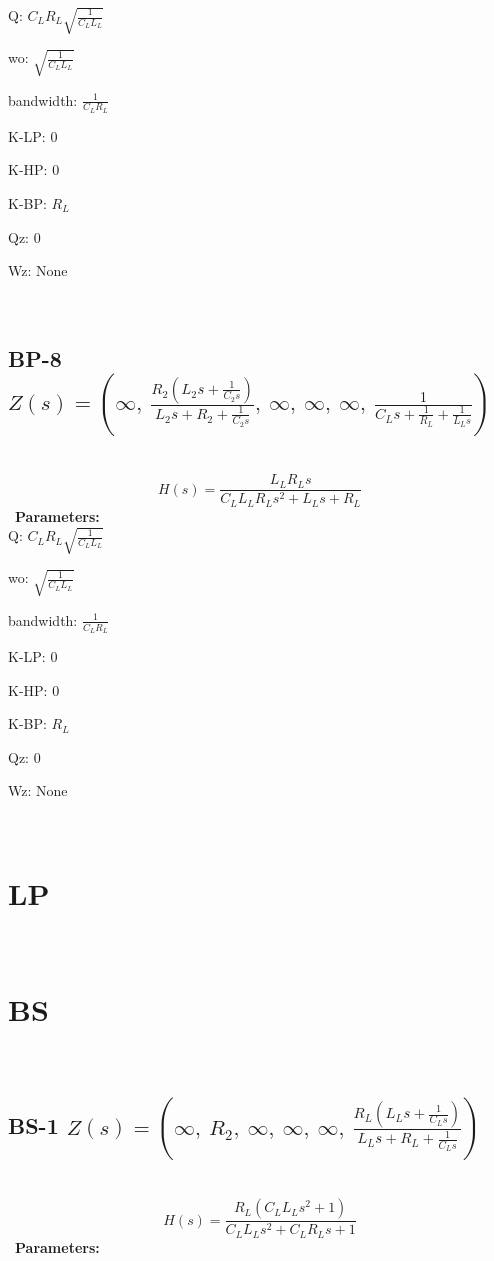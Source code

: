 \documentclass{article}
\begin{document}
Q: $C_{L} R_{L} \sqrt{\frac{1}{C_{L} L_{L}}}$\ 

wo: $\sqrt{\frac{1}{C_{L} L_{L}}}$\ 

bandwidth: $\frac{1}{C_{L} R_{L}}$\ 

K-LP: $0$\ 

K-HP: $0$\ 

K-BP: $R_{L}$\ 

Qz: $0$\ 

Wz: $\text{None}$\ 

\ 

\subsection{BP-8 $Z(s) = \left( \infty, \  \frac{R_{2} \left(L_{2} s + \frac{1}{C_{2} s}\right)}{L_{2} s + R_{2} + \frac{1}{C_{2} s}}, \  \infty, \  \infty, \  \infty, \  \frac{1}{C_{L} s + \frac{1}{R_{L}} + \frac{1}{L_{L} s}}\right)$ } \ 
\textbf{\[H(s) = \frac{L_{L} R_{L} s}{C_{L} L_{L} R_{L} s^{2} + L_{L} s + R_{L}}\] } \ 
\textbf{Parameters:}\\ 

Q: $C_{L} R_{L} \sqrt{\frac{1}{C_{L} L_{L}}}$\ 

wo: $\sqrt{\frac{1}{C_{L} L_{L}}}$\ 

bandwidth: $\frac{1}{C_{L} R_{L}}$\ 

K-LP: $0$\ 

K-HP: $0$\ 

K-BP: $R_{L}$\ 

Qz: $0$\ 

Wz: $\text{None}$\ 

\ 

\section{LP}\ 
\section{BS}\ 
\subsection{BS-1 $Z(s) = \left( \infty, \  R_{2}, \  \infty, \  \infty, \  \infty, \  \frac{R_{L} \left(L_{L} s + \frac{1}{C_{L} s}\right)}{L_{L} s + R_{L} + \frac{1}{C_{L} s}}\right)$ } \ 
\textbf{\[H(s) = \frac{R_{L} \left(C_{L} L_{L} s^{2} + 1\right)}{C_{L} L_{L} s^{2} + C_{L} R_{L} s + 1}\] } \ 
\textbf{Parameters:}\\ 
\end{document}
